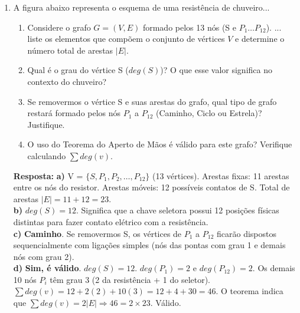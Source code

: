 \documentclass[12pt]{article}
\newcommand{\quadro}[1]{\vspace{0.2cm}\begin{tcolorbox}[colback=green!5, colframe=forestgreen, boxrule=0.5pt, arc=0pt] \textbf{Resposta:} #1 \end{tcolorbox}}
\begin{document}
\begin{enumerate}[label=\arabic*), leftmargin=1.5cm, itemsep=0.8cm]
\item A figura abaixo representa o esquema de uma resistência de chuveiro...
\begin{enumerate}[label=\alph*)]
    \item Considere o grafo $G = (V, E)$ formado pelos 13 nós (S e $P_1 \dots P_{12}$). ... liste os elementos que compõem o conjunto de vértices $V$ e determine o número total de arestas $|E|$.
    \item Qual é o grau do vértice S ($deg(S)$)? O que esse valor significa no contexto do chuveiro?
    \item Se removermos o vértice S e suas arestas do grafo, qual tipo de grafo restará formado pelos nós $P_1$ a $P_{12}$ (Caminho, Ciclo ou Estrela)? Justifique.
    \item O uso do Teorema do Aperto de Mãos é válido para este grafo? Verifique calculando $\sum deg(v)$.
\end{enumerate}
\quadro{
\textbf{a)} V = $\{S, P_1, P_2, \dots, P_{12}\}$ (13 vértices). Arestas fixas: 11 arestas entre os nós do resistor. Arestas móveis: 12 possíveis contatos de S. Total de arestas $|E| = 11 + 12 = 23$. \\
\textbf{b)} $deg(S) = 12$. Significa que a chave seletora possui 12 posições físicas distintas para fazer contato elétrico com a resistência. \\
\textbf{c)} \textbf{Caminho}. Se removermos S, os vértices de $P_1$ a $P_{12}$ ficarão dispostos sequencialmente com ligações simples (nós das pontas com grau 1 e demais nós com grau 2). \\
\textbf{d)} \textbf{Sim, é válido}. $deg(S) = 12$. $deg(P_1) = 2$ e $deg(P_{12}) = 2$. Os demais 10 nós $P_i$ têm grau 3 (2 da resistência + 1 do seletor). $\sum deg(v) = 12 + 2(2) + 10(3) = 12 + 4 + 30 = 46$. O teorema indica que $\sum deg(v) = 2|E| \Rightarrow 46 = 2 \times 23$. Válido.
}


\end{enumerate}
\end{document}
